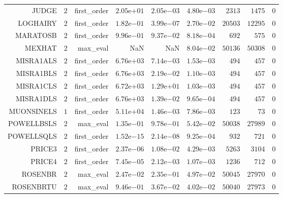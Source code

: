 \begin{longtable}{rrrrrrrrr}
JUDGE & \(     2\) & first\_order & \( 2.05\)e\(+01\) & \( 2.05\)e\(-03\) & \( 4.80\)e\(-03\) & \(  2313\) & \(  1475\) & \(     0\) \\
LOGHAIRY & \(     2\) & first\_order & \( 1.82\)e\(-01\) & \( 3.99\)e\(-07\) & \( 2.70\)e\(-02\) & \( 20503\) & \( 12295\) & \(     0\) \\
MARATOSB & \(     2\) & first\_order & \( 9.96\)e\(-01\) & \( 9.37\)e\(-02\) & \( 8.18\)e\(-04\) & \(   692\) & \(   575\) & \(     0\) \\
MEXHAT & \(     2\) & max\_eval &       NaN &       NaN & \( 8.04\)e\(-02\) & \( 50136\) & \( 50308\) & \(     0\) \\
MISRA1ALS & \(     2\) & first\_order & \( 6.76\)e\(+03\) & \( 7.14\)e\(-03\) & \( 1.53\)e\(-03\) & \(   494\) & \(   457\) & \(     0\) \\
MISRA1BLS & \(     2\) & first\_order & \( 6.76\)e\(+03\) & \( 2.19\)e\(-02\) & \( 1.10\)e\(-03\) & \(   494\) & \(   457\) & \(     0\) \\
MISRA1CLS & \(     2\) & first\_order & \( 6.72\)e\(+03\) & \( 1.29\)e\(+01\) & \( 1.03\)e\(-03\) & \(   494\) & \(   457\) & \(     0\) \\
MISRA1DLS & \(     2\) & first\_order & \( 6.76\)e\(+03\) & \( 1.39\)e\(-02\) & \( 9.65\)e\(-04\) & \(   494\) & \(   457\) & \(     0\) \\
MUONSINELS & \(     1\) & first\_order & \( 5.11\)e\(+04\) & \( 1.46\)e\(-03\) & \( 7.86\)e\(-03\) & \(   123\) & \(    73\) & \(     0\) \\
POWELLBSLS & \(     2\) & max\_eval & \( 1.35\)e\(-01\) & \( 9.78\)e\(-01\) & \( 5.42\)e\(-02\) & \( 50038\) & \( 27989\) & \(     0\) \\
POWELLSQLS & \(     2\) & first\_order & \( 1.52\)e\(-15\) & \( 2.14\)e\(-08\) & \( 9.25\)e\(-04\) & \(   932\) & \(   721\) & \(     0\) \\
PRICE3 & \(     2\) & first\_order & \( 2.37\)e\(-06\) & \( 1.08\)e\(-02\) & \( 4.29\)e\(-03\) & \(  5263\) & \(  3104\) & \(     0\) \\
PRICE4 & \(     2\) & first\_order & \( 7.45\)e\(-05\) & \( 2.12\)e\(-03\) & \( 1.07\)e\(-03\) & \(  1236\) & \(   712\) & \(     0\) \\
ROSENBR & \(     2\) & max\_eval & \( 2.47\)e\(-02\) & \( 2.35\)e\(-01\) & \( 4.97\)e\(-02\) & \( 50045\) & \( 27970\) & \(     0\) \\
ROSENBRTU & \(     2\) & max\_eval & \( 9.46\)e\(-01\) & \( 3.67\)e\(-02\) & \( 4.02\)e\(-02\) & \( 50040\) & \( 27973\) & \(     0\) \\

\end{longtable}

